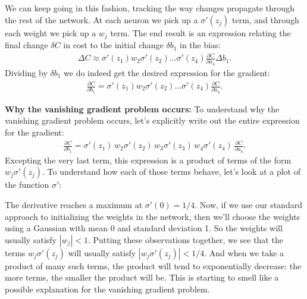 \documentclass[a4paper,twoside,10pt]{book}
\begin{document}
We can keep going in this fashion, tracking the way changes propagate through the rest of the network. At each neuron we pick up a $\sigma'(z_j)$ term, and through each weight we pick up a $w_j$ term. The end result is an expression relating the final change $\delta C$ in cost to the initial change $\delta b_1$ in the bias:
\begin{eqnarray}
\Delta C  \approx  \sigma'(z_1) w_2 \sigma'(z_2) \ldots \sigma'(z_4) \frac{\partial C}{\partial a_4} \Delta b_1. \label{eq:120}
\end{eqnarray}
Dividing by $\delta b_1$ we do indeed get the desired expression for the gradient:
\begin{eqnarray}
\frac{\partial C}{\partial b_1} = \sigma'(z_1) w_2 \sigma'(z_2) \ldots \sigma'(z_4) \frac{\partial C}{\partial a_4}. \label{eq:121}
\end{eqnarray}

\textbf{Why the vanishing gradient problem occurs:} To understand why the vanishing gradient problem occurs, let's explicitly write out the entire expression for the gradient:
\begin{eqnarray}
\frac{\partial C}{\partial b_1} = \sigma'(z_1) \, w_2 \sigma'(z_2) \,w_3 \sigma'(z_3) \, w_4 \sigma'(z_4) \, \frac{\partial C}{\partial a_4}.\label{eq:122}
\end{eqnarray}
Excepting the very last term, this expression is a product of terms of the form $w_j\sigma'(z_j)$. To understand how each of those terms behave, let's look at a plot of the function $\sigma'$:
\begin{center} 
\end{center}%
The derivative reaches a maximum at $\sigma'(0)=1/4$. Now, if we use our standard approach to initializing the weights in the network, then we'll choose the weights using a Gaussian with mean 0 and standard deviation 1. So the weights will usually satisfy $|w_j|<1$. Putting these observations together, we see that the terms $w_j\sigma'(z_j)$ will usually satisfy $|w_j\sigma'(z_j)|<1/4$. And when we take a product of many such terms, the product will tend to exponentially decrease: the more terms, the smaller the product will be. This is starting to smell like a possible explanation for the vanishing gradient problem.
\end{document}
